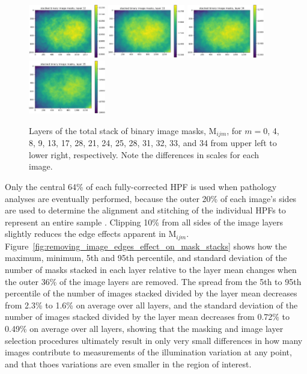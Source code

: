 \documentclass[letterpaper,11pt]{article}
\newcommand{\reffig}[1]{Figure~\ref{#1}}
\newcommand{\Mu}{\mathrm{M}}
\begin{document}
\begin{figure}[!ht]
\includegraphics[width=0.3\textwidth]{images/measuring_flatfield_corrections/mask_stack_layers/mask_stack_layer_32}
\includegraphics[width=0.3\textwidth]{images/measuring_flatfield_corrections/mask_stack_layers/mask_stack_layer_33}
\includegraphics[width=0.3\textwidth]{images/measuring_flatfield_corrections/mask_stack_layers/mask_stack_layer_34}
\includegraphics[width=0.3\textwidth]{images/measuring_flatfield_corrections/mask_stack_layers/mask_stack_layer_35}
\caption{\footnotesize Layers of the total stack of binary image masks, $\Mu_{ijm}$, for $m=$0, 4, 8, 9, 13, 17, 28, 21, 24, 25, 28, 31, 32, 33, and 34 from upper left to lower right, respectively. Note the differences in scales for each image.}
\label{fig:mask_stack_layers}
\end{figure}

Only the central 64\% of each fully-corrected HPF is used when pathology analyses are eventually performed, because the outer 20\% of each image's sides are used to determine the alignment and stitching of the individual HPFs to represent an entire sample \cite{Heshy}. Clipping 10\% from all sides of the image layers slightly reduces the edge effects apparent in $\Mu_{ijm}$. \reffig{fig:removing_image_edges_effect_on_mask_stacks} shows how the maximum, minimum, 5th and 95th percentile, and standard deviation of the number of masks stacked in each layer relative to the layer mean changes when the outer 36\% of the image layers are removed. The spread from the 5th to 95th percentile of the number of images stacked divided by the layer mean decreases from 2.3\% to 1.6\% on average over all layers, and the standard deviation of the number of images stacked divided by the layer mean decreases from 0.72\% to 0.49\% on average over all layers, showing that the masking and image layer selection procedures ultimately result in only very small differences in how many images contribute to measurements of the illumination variation at any point, and that thoes variations are even smaller in the region of interest.
\end{document}

